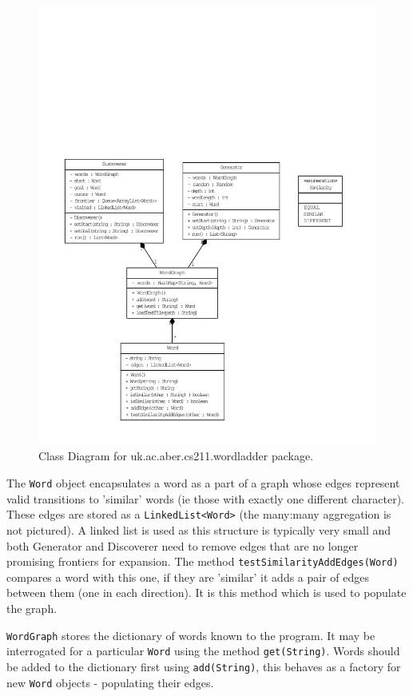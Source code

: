 \documentclass[11pt]{article} %
\begin{document}
\begin{figure}[h!!]
\includegraphics[width=\textwidth]{ClassDiagram}
\caption{Class Diagram for uk.ac.aber.cs211.wordladder package.}
\label{fig:ClassDiagram}
\end{figure}

The \texttt{Word} object encapsulates a word as a part of a graph whose edges represent valid transitions to 'similar' words (ie those with exactly one different character). These edges are stored as a \texttt{LinkedList<Word>} (the many:many aggregation is not pictured). A linked list is used as this structure is typically very small and both Generator and Discoverer need to remove edges that are no longer promising frontiers for expansion. The method \texttt{testSimilarityAddEdges(Word)} compares a word with this one, if they are 'similar' it adds a pair of edges between them (one in each direction). It is this method which is used to populate the graph.

\texttt{WordGraph} stores the dictionary of words known to the program. It may be interrogated for a particular \texttt{Word} using the method \texttt{get(String)}. Words should be added to the dictionary first using \texttt{add(String)}, this behaves as a factory for new \texttt{Word} objects - populating their edges.
\end{document}
